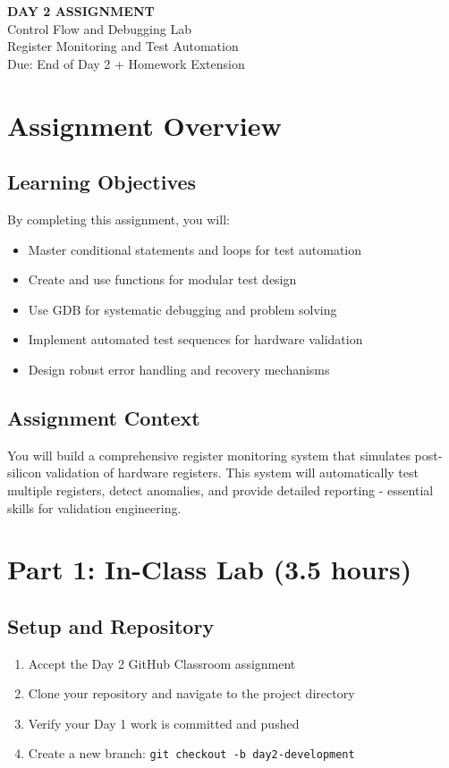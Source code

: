\documentclass[11pt,a4paper]{article}
\begin{document}
\begin{center}
    {\Huge\bfseries\color{codeblue} DAY 2 ASSIGNMENT}\\[0.5cm]
    {\Large Control Flow and Debugging Lab}\\[0.3cm]
    {\large Register Monitoring and Test Automation}\\[0.2cm]
    {\normalsize Due: End of Day 2 + Homework Extension}
\end{center}

\vspace{1cm}

\section{Assignment Overview}

\subsection{Learning Objectives}
By completing this assignment, you will:
\begin{itemize}
    \item Master conditional statements and loops for test automation
    \item Create and use functions for modular test design
    \item Use GDB for systematic debugging and problem solving
    \item Implement automated test sequences for hardware validation
    \item Design robust error handling and recovery mechanisms
\end{itemize}

\subsection{Assignment Context}
You will build a comprehensive register monitoring system that simulates post-silicon validation of hardware registers. This system will automatically test multiple registers, detect anomalies, and provide detailed reporting - essential skills for validation engineering.

\section{Part 1: In-Class Lab (3.5 hours)}

\subsection{Setup and Repository}
\begin{enumerate}
    \item Accept the Day 2 GitHub Classroom assignment
    \item Clone your repository and navigate to the project directory
    \item Verify your Day 1 work is committed and pushed
    \item Create a new branch: \texttt{git checkout -b day2-development}
\end{enumerate}
\end{document}

